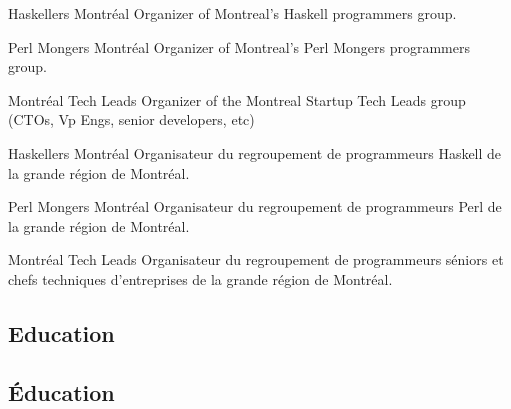 \begin{description}

\begin{langen}
\item[Haskellers Montr\'{e}al] Organizer of Montreal's Haskell programmers group.
\item[Perl Mongers Montr\'{e}al] Organizer of Montreal's Perl Mongers programmers group.
\item[Montr\'{e}al Tech Leads] Organizer of the Montreal Startup Tech Leads group (CTOs, Vp Engs, senior developers, etc)
\end{langen}
\begin{langfr}
\item[Haskellers Montr\'{e}al] Organisateur du regroupement de programmeurs Haskell de la grande r\'{e}gion de Montr\'{e}al.
\item[Perl Mongers Montr\'{e}al] Organisateur du regroupement de programmeurs Perl de la grande r\'{e}gion de Montr\'{e}al.
\item[Montr\'{e}al Tech Leads] Organisateur du regroupement de programmeurs s\'{e}niors et chefs techniques d'entreprises de la grande r\'{e}gion de Montr\'{e}al.
\end{langfr}
\end{description}

\begin{langen}
\section{Education}
\end{langen}
\begin{langfr}
\section{\'Education}
\end{langfr}

\begin{langen}
\end{langen}
\begin{langfr}
\end{langfr}

